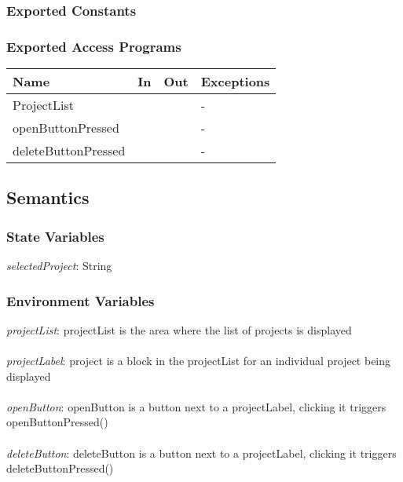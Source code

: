 \documentclass[12pt, titlepage]{article}
\begin{document}
	\subsubsection{Exported Constants}
	
	\subsubsection{Exported Access Programs}
	
	\begin{center}
		\begin{tabular}{p{2cm} p{4cm} p{4cm} p{2cm}}
			\hline
			\textbf{Name} & \textbf{In} & \textbf{Out} & \textbf{Exceptions} \\
			\hline
			ProjectList &  &  & - \\
			\hline
			openButtonPressed &  &  & - \\
			\hline
			deleteButtonPressed &  &  & - \\
			\hline
		\end{tabular}
	\end{center}
	
	\subsection{Semantics}
	
	\subsubsection{State Variables}
	\textit{selectedProject}: String
	
	\subsubsection{Environment Variables}
	
	\textit{projectList}: projectList is the area where the list of projects is displayed \\\\ 
	\textit{projectLabel}: project is a block in the projectList for an individual project being displayed\\\\
	\textit{openButton}: openButton is a button next to a projectLabel, clicking it triggers openButtonPressed()\\\\
	\textit{deleteButton}: deleteButton is a button next to a projectLabel, clicking it triggers deleteButtonPressed() \\\\
	
\end{document}

